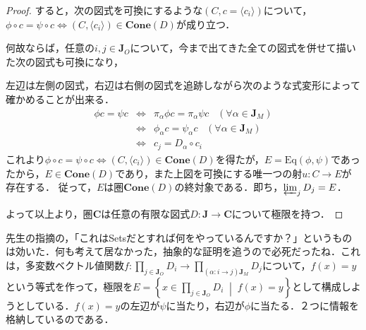 \documentclass[uplatex, dvipdfmx]{jsarticle}
\begin{document}
\begin{proof}
    すると，次の図式を可換にするような$(C,c=\langle c_i\rangle)$について，$\phi\circ c=\psi\circ c\Leftrightarrow (C,\langle c_i\rangle)\in\mathbf{Cone}(D)$が成り立つ．
    \begin{center}
    \end{center}
    何故ならば，任意の$i,j\in\mathbf{J}_O$について，今まで出てきた全ての図式を併せて描いた次の図式も可換になり，
    \begin{center}
    \end{center}
    左辺は左側の図式，右辺は右側の図式を追跡しながら次のような式変形によって確かめることが出来る．
    \begin{eqnarray*}
        \phi c = \psi c &\Leftrightarrow& \pi_\alpha\phi c =\pi_\alpha\psi c \;\;\;(\forall\alpha\in\mathbf{J}_M ) \\
        &\Leftrightarrow& \phi_\alpha c =\psi_\alpha c \;\;\;(\forall\alpha\in\mathbf{J}_M ) \\
        &\Leftrightarrow& c_j = D_\alpha\circ c_i
    \end{eqnarray*}
    これより$\phi\circ c=\psi\circ c\Leftrightarrow (C,\langle c_i\rangle)\in\mathbf{Cone}(D)$を得たが，$E=\mathrm{Eq}(\phi,\psi)$であったから，$E\in\mathbf{Cone}(D)$であり，また上図を可換にする唯一つの射$u:C\to E$が存在する．
    従って，$E$は圏$\mathbf{Cone}(D)$の終対象である．即ち，$\varprojlim_{j}D_j=E$．

    よって以上より，圏$\mathbf{C}$は任意の有限な図式$D:\mathbf{J}\to\mathbf{C}$について極限を持つ．
\end{proof}
\begin{remark*}
    先生の指摘の，「これはSetsだとすれば何をやっているんですか？」というものは効いた．何も考えて居なかった，抽象的な証明を追うので必死だったね．これは，多変数ベクトル値関数$f:\prod_{j\in\mathbf{J}_O}D_i\to\prod_{(\alpha:i\to j)\mathbf{J}_M}D_j$について，$f(x)=y$という等式を作って，極限を$E=\left\{x\in\prod_{j\in\mathbf{J}_O}D_i\;\middle|\;f(x)=y\right\}$として構成しようとしている．$f(x)=y$の左辺が$\psi$に当たり，右辺が$\phi$に当たる．２つに情報を格納しているのである．
\end{remark*}
\end{document}
